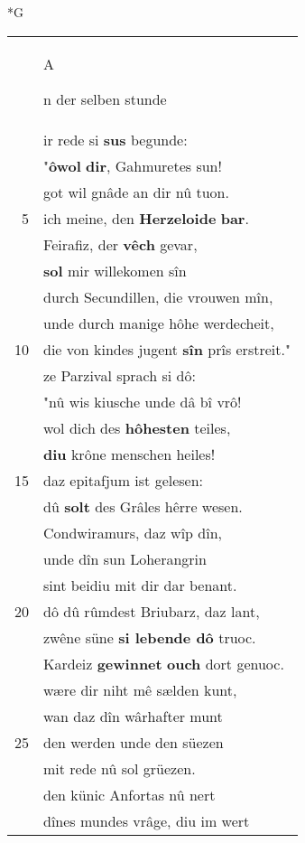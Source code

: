 \documentclass[8pt,a4paper,notitlepage]{article}
\begin{document}
\begin{table}[ht]
\begin{minipage}[t]{0.5\linewidth}
\small
\begin{center}*G
\end{center}
\begin{tabular}{rl}
 & \begin{large}A\end{large}n der selben stunde\\ 
 & ir rede si \textbf{sus} begunde:\\ 
 & "\textbf{ôwol} \textbf{dir}, Gahmuretes sun!\\ 
 & got wil gnâde an dir nû tuon.\\ 
5 & ich meine, den \textbf{Herzeloide} \textbf{bar}.\\ 
 & Feirafiz, der \textbf{vêch} gevar,\\ 
 & \textbf{sol} mir willekomen sîn\\ 
 & durch Secundillen, die vrouwen mîn,\\ 
 & unde durch manige hôhe werdecheit,\\ 
10 & die von kindes jugent \textbf{sîn} prîs erstreit."\\ 
 & ze Parzival sprach si dô:\\ 
 & "nû wis kiusche unde dâ bî vrô!\\ 
 & wol dich des \textbf{hôhesten} teiles,\\ 
 & \textbf{diu} krône menschen heiles!\\ 
15 & daz epitafjum ist gelesen:\\ 
 & dû \textbf{solt} des Grâles hêrre wesen.\\ 
 & Condwiramurs, daz wîp dîn,\\ 
 & unde dîn sun Loherangrin\\ 
 & sint beidiu mit dir dar benant.\\ 
20 & dô dû rûmdest Briubarz, daz lant,\\ 
 & zwêne süne \textbf{si lebende dô} truoc.\\ 
 & Kardeiz \textbf{gewinnet} \textbf{ouch} dort genuoc.\\ 
 & wære dir niht mê sælden kunt,\\ 
 & wan daz dîn wârhafter munt\\ 
25 & den werden unde den süezen\\ 
 & mit rede nû sol grüezen.\\ 
 & den künic Anfortas nû nert\\ 
 & dînes mundes vrâge, diu im wert\\ 

\end{tabular}
\end{minipage}
\end{table}
\end{document}

